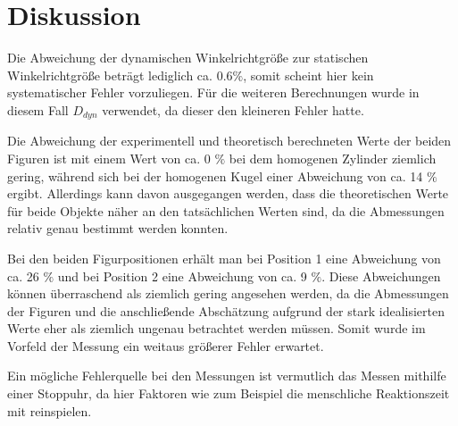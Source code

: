 \newpage

\section{Diskussion}

Die Abweichung der dynamischen Winkelrichtgröße zur statischen Winkelrichtgröße beträgt lediglich
ca. $0.6 \%$, somit scheint hier kein systematischer Fehler vorzuliegen. Für die weiteren Berechnungen
wurde in diesem Fall $D_{dyn}$ verwendet, da dieser den kleineren Fehler hatte.

Die Abweichung der experimentell und theoretisch berechneten Werte der beiden Figuren ist mit einem Wert von
ca. 0 $\%$ bei dem homogenen Zylinder ziemlich gering, während sich bei der homogenen Kugel einer
Abweichung von ca. 14 $\%$ ergibt. Allerdings kann davon ausgegangen
werden, dass die theoretischen Werte für beide Objekte näher an den tatsächlichen Werten sind, da
die Abmessungen relativ genau bestimmt werden konnten.

Bei den beiden Figurpositionen erhält man bei Position 1 eine Abweichung von ca. 26 $\%$ und bei Position 2 eine
Abweichung von ca. 9 $\%$. Diese Abweichungen können
überraschend als ziemlich gering angesehen werden, da die Abmessungen der Figuren und die anschließende
Abschätzung aufgrund der stark idealisierten Werte eher als ziemlich ungenau betrachtet werden müssen.
Somit wurde im Vorfeld der Messung ein weitaus größerer Fehler erwartet.

Ein mögliche Fehlerquelle bei den Messungen ist vermutlich das Messen mithilfe einer Stoppuhr,
da hier Faktoren wie zum Beispiel die menschliche Reaktionszeit mit reinspielen.

\newpage

\printbibliography


